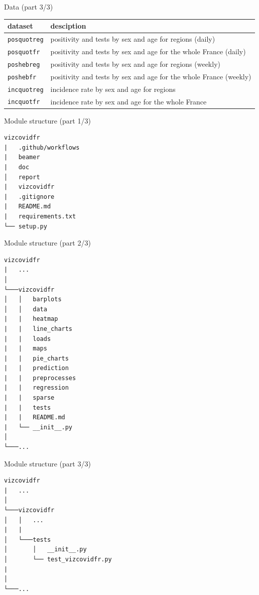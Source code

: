\documentclass[
  ignorenonframetext,
]{beamer}
\begin{document}
\begin{frame}[fragile]{Data (part 3/3)}
\protect\hypertarget{data-part-33}{}
\begin{longtable}[]{@{}
  >{\centering\arraybackslash}p{}
  >{\centering\arraybackslash}p{}@{}}
\toprule
dataset & desciption \\
\midrule
\endhead
\texttt{posquotreg} & positivity and tests by sex and age for regions
(daily) \\
\texttt{posquotfr} & positivity and tests by sex and age for the whole
France (daily) \\
\texttt{poshebreg} & positivity and tests by sex and age for regions
(weekly) \\
\texttt{poshebfr} & positivity and tests by sex and age for the whole
France (weekly) \\
\texttt{incquotreg} & incidence rate by sex and age for regions \\
\texttt{incquotfr} & incidence rate by sex and age for the whole
France \\
\bottomrule
\end{longtable}
\end{frame}

\begin{frame}[fragile]{Module structure (part 1/3)}
\protect\hypertarget{module-structure-part-13}{}
\begin{verbatim}
vizcovidfr
|   .github/workflows
|   beamer
|   doc
│   report
|   vizcovidfr
|   .gitignore
|   README.md
|   requirements.txt
└── setup.py
\end{verbatim}
\end{frame}

\begin{frame}[fragile]{Module structure (part 2/3)}
\protect\hypertarget{module-structure-part-23}{}
\begin{verbatim}
vizcovidfr
|   ...
│
└───vizcovidfr
│   │   barplots
│   │   data
|   |   heatmap
|   |   line_charts
|   |   loads
|   |   maps
|   |   pie_charts
|   |   prediction
|   |   preprocesses
|   |   regression
|   |   sparse
|   |   tests
|   |   README.md
|   └── __init__.py
│
└───...
\end{verbatim}
\end{frame}

\begin{frame}[fragile]{Module structure (part 3/3)}
\protect\hypertarget{module-structure-part-33}{}
\begin{verbatim}
vizcovidfr
|   ...
│
└───vizcovidfr
│   │   ...
|   |
│   └───tests
│       │   __init__.py
│       └── test_vizcovidfr.py
|
│
└───...
\end{verbatim}
\end{frame}
\end{document}
